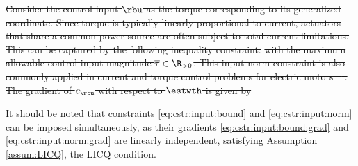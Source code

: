 \documentclass[letterpaper, journal]{IEEEtran}
\newcommand*{\template}{template}
\providecommand{\DIFdel}[1]{{\protect\color{red}\sout{#1}}} %
\providecommand{\DIFaddbegin}{} %
\providecommand{\DIFaddend}{} %
\providecommand{\DIFdelbegin}{} %
\providecommand{\DIFdelend}{} %
\begin{document}
\DIFdel{Consider the control input $\rbu$ as the torque corresponding to its generalized coordinate. 
Since torque is typically linearly proportional to current, actuators that share a common power source are often subject to total current limitations. 
This can be captured by the following inequality constraint: 
}%
\DIFdel{with the maximum allowable control input magnitude $\overline\tau\in\R_{>0}$. This input norm constraint is also commonly applied in current and torque control problems for electric motors \mbox{%
\cite{Choi:2024aa}}\hskip0pt%
.
The gradient of $c_{\rbu}$ with respect to $\estwth$ is given by
}%


\DIFdel{It should be noted that constraints \eqref{eq:cstr:input:bound} and \eqref{eq:cstr:input:norm} can be imposed simultaneously, as their gradients \eqref{eq:cstr:input:bound:grad} and \eqref{eq:cstr:input:norm:grad} are linearly independent, satisfying Assumption \ref{assum:LICQ}, }%
\DIFdel{the LICQ condition.
}%

\DIFdelend %

\DIFdelbegin %
\DIFdelend %
\DIFaddbegin 
\DIFaddend 
\end{document}
